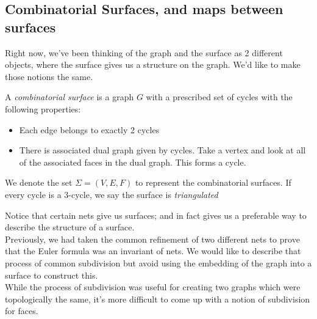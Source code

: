 \subsection{Combinatorial Surfaces, and maps between surfaces}
Right now, we've been thinking of the graph and the surface as 2 different objects, where the surface gives us a structure on the graph. We'd like to make those notions the same. 
\begin{definition}
 A \emph{combinatorial surface} is a graph $G$ with a prescribed set of cycles with the following properties: 
 \begin{itemize}
  \item Each edge belongs to exactly 2 cycles
  \item There is associated dual graph given by cycles. Take a vertex and look at all of the associated faces in the dual graph. This forms a cycle. 
 \end{itemize}
 We denote the set $\Sigma=(V, E, F)$ to represent the combinatorial surfaces.  If every cycle is a 3-cycle, we say the surface is \emph{triangulated}
\end{definition}
Notice that certain nets give us surfaces; and in fact gives us a preferable way to describe the structure of a surface. \\ 
Previously, we had taken the common refinement of two different nets to prove that the Euler formula was an invariant of nets. We would like to describe that process of common subdivision but avoid using the embedding of the graph into a surface to construct this. \\
While the process of subdivision was useful for creating two graphs which were topologically the same, it's more difficult to come up with a notion of subdivision for faces. \\

